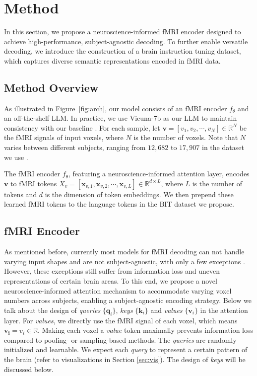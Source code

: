 \section{Method}
\label{sec:method}
In this section, we propose a neuroscience-informed fMRI encoder designed to achieve high-performance, subject-agnostic decoding. To further enable versatile decoding, we introduce the construction of a brain instruction tuning dataset, which captures diverse semantic representations encoded in fMRI data.

\subsection{Method Overview}
As illustrated in Figure~\ref{fig:arch}, our model consists of an fMRI encoder $f_\theta$ and an off-the-shelf LLM. In practice, we use Vicuna-7b \citep{zheng2023judging} as our LLM to maintain consistency with our baseline \citep{xia2024umbrae}. For each sample, let $\boldsymbol{v} = [v_1, v_2, \cdots, v_N]\in \mathbb{R}^N$ be the fMRI signals of input voxels, where $N$ is the number of voxels. Note that $N$ varies between different subjects, ranging from $12,682$ to $17,907$ in the dataset we use \citep{allen2022massive}.

The fMRI encoder $f_\theta$, featuring a neuroscience-informed attention layer, encodes $\boldsymbol{v}$ to fMRI tokens $X_v = [\boldsymbol{x}_{v,1}, \boldsymbol{x}_{v,2}, \cdots, \boldsymbol{x}_{v,L}] \in \mathbb{R}^{d\times L}$, where $L$ is the number of tokens and $d$ is the dimension of token embeddings. We then prepend these learned fMRI tokens to the language tokens in the BIT dataset we propose.

\subsection{fMRI Encoder}
As mentioned before, currently most models for fMRI decoding can not handle varying input shapes and are not subject-agnostic, with only a few exceptions \citep{wang2024unibrain}. However, these exceptions still suffer from information loss and uneven representations of certain brain areas. To this end, we propose a novel neuroscience-informed attention mechanism to accommodate varying voxel numbers across subjects, enabling a subject-agnostic encoding strategy. Below we talk about the design of \textit{queries} $\{\boldsymbol{q}_i\}$, \textit{keys} $\{\boldsymbol{k}_i\}$ and \textit{values} $\{\boldsymbol{v}_i\}$ in the attention layer. For \textit{values}, we directly use the fMRI signal of each voxel, which means $\boldsymbol{v_i} = v_i \in \mathbb{R}$. Making each voxel a \textit{value} token maximally prevents information loss compared to pooling- \citep{wang2024mindbridge} or sampling-based \citep{mai2023unibrain} methods. The \textit{queries} are randomly initialized and learnable. We expect each \textit{query} to represent a certain pattern of the brain (refer to visualizations in Section \ref{sec:vis}). The design of \textit{keys} will be discussed below.

